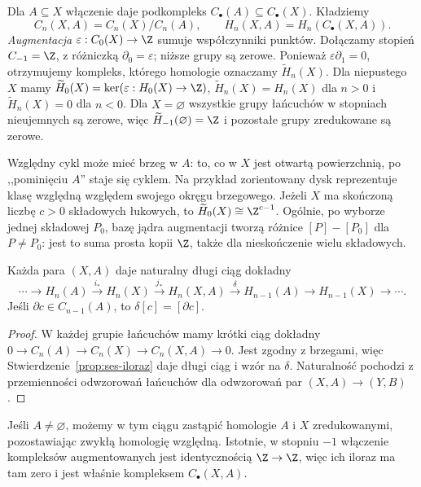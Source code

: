 \begin{definicja}
\label{def:homologia-wzgledna}
Dla $A\subseteq X$ włączenie daje
podkompleks $C_\bullet(A)\subseteq C_\bullet(X)$.
Kładziemy
\[
 C_n(X,A)=C_n(X)/C_n(A),\qquad
 H_n(X,A)=H_n(C_\bullet(X,A)).
\]
\emph{Augmentacja} $\varepsilon:C_0(X)\to\Z$ sumuje
współczynniki punktów. Dołączamy stopień $C_{-1}=\Z$,
z różniczką $\partial_0=\varepsilon$; niższe grupy są zerowe.
Ponieważ $\varepsilon\partial_1=0$, otrzymujemy kompleks,
którego homologie oznaczamy $\widetilde H_n(X)$.
Dla niepustego $X$ mamy
$\widetilde H_0(X)=\ker(\varepsilon:H_0(X)\to\Z)$,
$\widetilde H_n(X)=H_n(X)$ dla $n>0$ i
$\widetilde H_n(X)=0$ dla $n<0$.
Dla $X=\varnothing$ wszystkie grupy łańcuchów w stopniach
nieujemnych są zerowe, więc $\widetilde H_{-1}(\varnothing)=\Z$
i pozostałe grupy zredukowane są zerowe.
\end{definicja}

Względny cykl może mieć brzeg w $A$:
to, co w $X$ jest otwartą powierzchnią,
po ,,pominięciu $A$'' staje się cyklem.
Na przykład zorientowany dysk reprezentuje klasę względną
względem swojego okręgu brzegowego.
Jeżeli $X$ ma skończoną liczbę $c>0$ składowych łukowych,
to $\widetilde H_0(X)\cong\Z^{c-1}$.
Ogólnie, po wyborze jednej składowej $P_0$, bazę jądra
augmentacji tworzą różnice $[P]-[P_0]$ dla $P\ne P_0$:
jest to suma prosta kopii $\Z$, także dla nieskończenie wielu składowych.

\begin{twierdzenie}
\label{thm:les-pary}
Każda para $(X,A)$ daje naturalny
długi ciąg dokładny
\begin{equation}\label{eq:les-pary}
 \cdots\to H_n(A)\xrightarrow{i_*}H_n(X)
 \xrightarrow{j_*}H_n(X,A)
 \xrightarrow{\delta}H_{n-1}(A)
 \to H_{n-1}(X)\to\cdots.
\end{equation}
Jeśli $\partial c\in C_{n-1}(A)$,
to $\delta[c]=[\partial c]$.
\end{twierdzenie}
\begin{proof}
W każdej grupie łańcuchów mamy
krótki ciąg dokładny
$0\to C_n(A)\to C_n(X)\to C_n(X,A)\to0$.
Jest zgodny z brzegami, więc
Stwierdzenie~\ref{prop:ses-iloraz}
daje długi ciąg i wzór na $\delta$.
Naturalność pochodzi z przemienności
odwzorowań łańcuchów dla odwzorowań
par $(X,A)\to(Y,B)$.
\end{proof}

Jeśli $A\ne\varnothing$, możemy w tym ciągu zastąpić homologie
$A$ i $X$ zredukowanymi, pozostawiając zwykłą homologię względną.
Istotnie, w stopniu $-1$ włączenie kompleksów augmentowanych
jest identycznością $\Z\to\Z$, więc ich iloraz ma tam zero
i jest właśnie kompleksem $C_\bullet(X,A)$.

